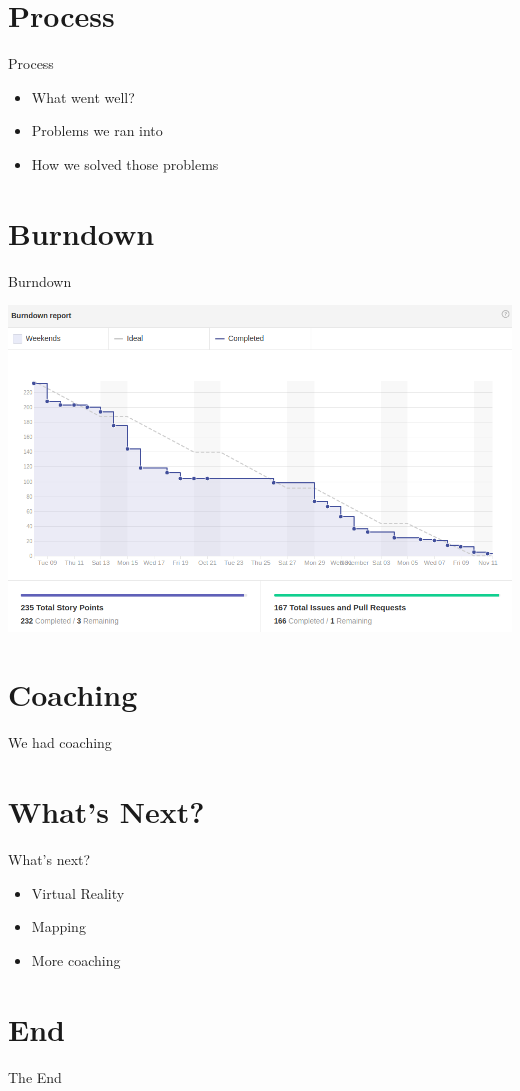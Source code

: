 \documentclass{beamer}
\begin{document}
\section{Process}
\begin{frame}{Process}
    \begin{itemize}
        \item What went well?
        \item Problems we ran into
        \item How we solved those problems
    \end{itemize}
\end{frame}

\section{Burndown}
\begin{frame}{Burndown}
    \begin{center}
      \includegraphics[scale=1.25]{images/burndown.png}
    \end{center}
\end{frame}

\section{Coaching}
\begin{frame}
\Huge{\centerline{We had coaching}}
\end{frame}

\section{What's Next? }
\begin{frame}{What's next?}
    \begin{itemize}
        \item Virtual Reality
        \item Mapping
        \item More coaching
    \end{itemize}
\end{frame}

\section{End}
\begin{frame}
\Huge{\centerline{The End}}
\end{frame}
\end{document}
